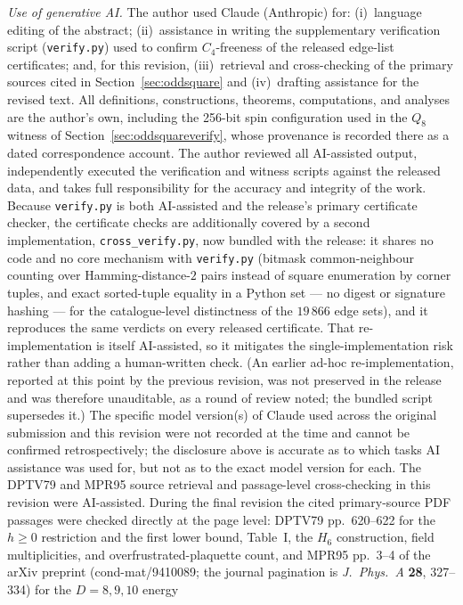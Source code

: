 \documentclass[12pt,a4paper]{article}
\theoremstyle{definition}
\begin{document}
\noindent\textit{Use of generative AI.} The author used Claude (Anthropic)
for: (i)~language editing of the abstract; (ii)~assistance in writing the
supplementary verification script (\texttt{verify.py}) used to confirm
$C_4$-freeness of the released edge-list certificates; and, for this
revision, (iii)~retrieval and cross-checking of the primary sources cited
in Section~\ref{sec:oddsquare} and (iv)~drafting assistance for the revised
text. All definitions, constructions, theorems, computations, and analyses
are the author's own, including the 256-bit spin configuration used in
the $Q_8$ witness of Section~\ref{sec:oddsquareverify}, whose provenance
is recorded there as a dated correspondence account. The author reviewed all
AI-assisted output, independently executed the verification and witness
scripts against the released data, and takes full responsibility for the
accuracy and integrity of the work. Because \texttt{verify.py} is both
AI-assisted and the release's primary certificate checker, the certificate
checks are additionally covered by a second implementation,
\texttt{cross\_verify.py}, now bundled with the release: it shares no code
and no core mechanism with \texttt{verify.py} (bitmask common-neighbour
counting over Hamming-distance-$2$ pairs instead of square enumeration by
corner tuples, and exact sorted-tuple equality in a Python set --- no
digest or signature hashing --- for the
catalogue-level distinctness of the $19\,866$ edge sets), and it reproduces
the same verdicts on every released certificate. That re-implementation is
itself AI-assisted, so it mitigates the single-implementation risk rather
than adding a human-written check. (An earlier ad-hoc re-implementation,
reported at this point by the previous revision, was not preserved in the
release and was therefore unauditable, as a round of review noted; the
bundled script supersedes it.) The specific model version(s) of
Claude used across the original submission and this revision were not
recorded at the time and cannot be confirmed retrospectively; the
disclosure above is accurate as to which tasks AI assistance was used
for, but not as to the exact model version for each. The DPTV79 and MPR95 source retrieval and passage-level cross-checking in
this revision were AI-assisted. During the final revision the cited
primary-source PDF passages were checked directly at the page level: DPTV79
pp.~620--622 for the $h\ge0$ restriction and the first lower bound, Table~I,
the $H_6$ construction, field multiplicities, and
overfrustrated-plaquette count, and MPR95 pp.~3--4 of the arXiv preprint (cond-mat/9410089; the journal pagination is \textit{J.\ Phys.\ A} \textbf{28}, 327--334) for the $D=8,9,10$ energy
\end{document}
